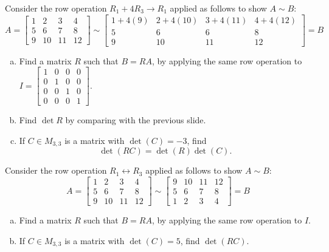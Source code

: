 \begin{activity}{5}
Consider the row operation \(R_1+4R_3\to R_1\) applied as follows to show
\(A\sim B\):
\[
A=\begin{bmatrix}1&2&3 & 4\\5&6 & 7 & 8\\9 & 10 & 11 & 12\end{bmatrix} 
  \sim
\begin{bmatrix}1+4(9)&2+4(10)&3+4(11) & 4+4(12) \\5&6 & 6 & 8\\9 & 10 & 11 & 12\end{bmatrix}=B
\]
\begin{enumerate}[(a)]
\item Find a matrix \(R\) such that \(B=RA\), by applying the same row operation to 
\(I=\begin{bmatrix}1&0&0&0\\0&1&0&0\\0&0&1&0\\0&0&0&1\end{bmatrix}\).
\item Find \(\det R\) by comparing with the previous slide.
\item If \(C \in M_{3,3}\) is a matrix with \(\det(C)= -3\), find 
\[\det(RC)=\det(R)\det(C).\]
\end{enumerate}
\end{activity}

\begin{activity}{5}
Consider the row operation \(R_1\leftrightarrow R_3\) applied as follows to show
\(A\sim B\):
\[
A=\begin{bmatrix}1&2&3&4\\5&6&7&8\\9&10&11&12\end{bmatrix}
  \sim
\begin{bmatrix}9&10&11&12\\5&6&7&8\\1&2&3&4\end{bmatrix}=B
\]
\begin{enumerate}[(a)]
\item Find a matrix \(R\) such that \(B=RA\), by applying the same row operation to \(I\).
\item If \(C \in M_{3,3}\) is a matrix with \(\det(C)= 5\), find \(\det(RC)\).
\end{enumerate}
\end{activity}


